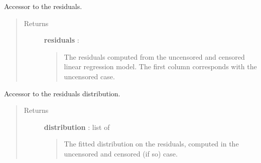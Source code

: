 \documentclass[letterpaper,10pt,english]{sphinxmanual}
\begin{document}
\begin{fulllineitems}
\begin{fulllineitems}
\end{fulllineitems}


\begin{fulllineitems}
\label{_generated/otpod.UnivariateLinearModelAnalysis:otpod.UnivariateLinearModelAnalysis.getResiduals}
Accessor to the residuals.
\begin{quote}\begin{description}
\item[{Returns}] \leavevmode
\textbf{residuals} : \href{http://doc.openturns.org/openturns-latest/sphinx/user\_manual/\_generated/openturns.NumericalSample.html\#openturns.NumericalSample}{}
\begin{quote}

The residuals computed from the uncensored and censored linear
regression model. The first column corresponds with the uncensored case.
\end{quote}

\end{description}\end{quote}

\end{fulllineitems}


\begin{fulllineitems}
\label{_generated/otpod.UnivariateLinearModelAnalysis:otpod.UnivariateLinearModelAnalysis.getResidualsDistribution}
Accessor to the residuals distribution.
\begin{quote}\begin{description}
\item[{Returns}] \leavevmode
\textbf{distribution} : list of \href{http://doc.openturns.org/openturns-latest/sphinx/user\_manual/\_generated/openturns.Distribution.html\#openturns.Distribution}{}
\begin{quote}

The fitted distribution on the residuals, computed in the uncensored
and censored (if so) case.
\end{quote}

\end{description}\end{quote}


\end{fulllineitems}
\end{fulllineitems}
\end{document}
